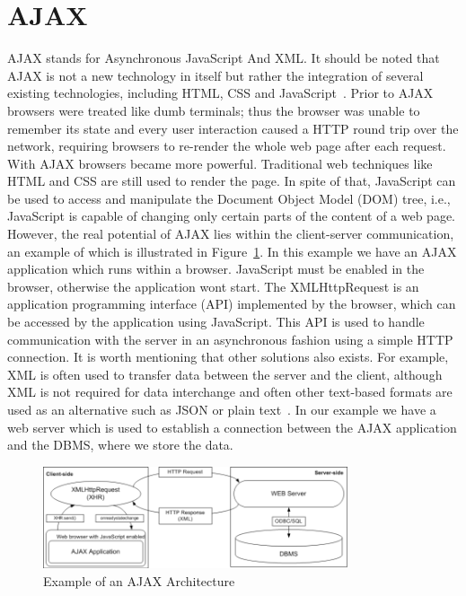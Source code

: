 \section{AJAX}
\label{sec:ajax}
AJAX stands for Asynchronous JavaScript And XML. It should be noted
that AJAX is not a new technology in itself but rather the integration of several 
existing technologies, including HTML, CSS and JavaScript~\cite{w3}. Prior to AJAX browsers 
were treated 
like dumb terminals; thus the browser was unable to remember its state and every 
user interaction caused a HTTP round trip over the network, requiring browsers 
to re-render the whole web page after each request. With AJAX browsers became 
more powerful. Traditional web techniques like HTML and CSS are still used to 
render the page. In spite of that, JavaScript can be used to access 
and manipulate the Document Object Model (DOM) tree, i.e., 
JavaScript is capable of changing only certain parts
of the content of a web page. However, the
real potential of AJAX lies within the client-server communication, an example
of which is illustrated in Figure~\ref{fig:ajax01}. In this example we have an AJAX application
which runs within a browser. JavaScript must be enabled in the browser, otherwise
the application wont start.  
The XMLHttpRequest is an application programming interface (API) implemented by the browser,
which can be accessed by the application using JavaScript. This API is 
used to handle communication with the server in an asynchronous fashion using a
simple HTTP connection. It is worth mentioning that other solutions also exists. 
For example, XML is often used to transfer data between the server and the client, 
although XML is not required for data interchange and often other text-based
formats are used as an alternative such as JSON or plain text~\cite{bajax1}. In our example we have 
a web server which is used to establish a connection between the AJAX application and
the DBMS, where we store the data.

\begin{figure}[h]
	\begin{center}
		\includegraphics[width=0.8\textwidth]{./img/ajax01a.png}
		\caption{Example of an AJAX Architecture}
		\label{fig:ajax01}
	\end{center}
\end{figure}

